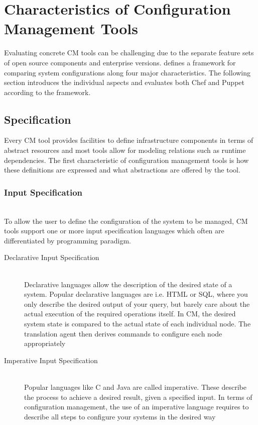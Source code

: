 \section{Characteristics of Configuration Management Tools}

Evaluating concrete CM tools can be challenging due to the separate feature sets of open source components and enterprise versions. \cite{delaet2010survey} defines a framework for comparing system configurations along four major characteristics. The following section introduces the individual aspects and evaluates both Chef and Puppet according to the framework.

\subsection{Specification}

Every CM tool provides facilities to define infrastructure components in terms of abstract resources and most tools allow for modeling relations such as runtime dependencies. The first characteristic of configuration management tools is how these definitions are expressed and what abstractions are offered by the tool.

\subsubsection{Input Specification}\hfill\\

To allow the user to define the configuration of the system to be managed, CM tools support one or more input specification languages which often are differentiated by programming paradigm.

\begin{description}
	\item [Declarative Input Specification] \hfill \\
	Declarative languages allow the description of the desired state of a system. Popular declarative languages are i.e. HTML or SQL, where you only describe the desired output of your query, but barely care about the actual execution of the required operations itself. In CM, the desired system state is compared to the actual state of each individual node. The translation agent then derives commands to configure each node appropriately \cite{delaet2010survey}
	\item [Imperative Input Specification] \hfill \\
	Popular languages like C and Java are called imperative. These describe the process to achieve a desired result, given a specified input. In terms of configuration management, the use of an imperative language requires to describe all steps to configure your systems in the desired way  
\end{description}

